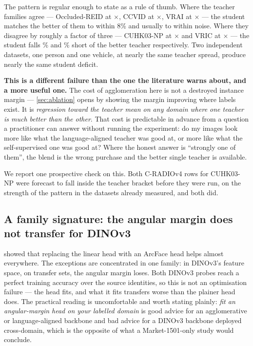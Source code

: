 \begin{table}[t]
\centering
\caption{Best-of-family ArcFace mAP, with the teachers' spread and the student's position
inside it. \emph{spread} is the ratio of the better teacher family to the worse; \emph{vs.\
best} is the student's relative distance from the better one. The two datasets where the
teachers disagree by roughly 3$\times$ both cost the student roughly
45\%.}
\label{tab:bracket}
\scriptsize
\setlength{\tabcolsep}{3pt}

\end{table}

The pattern is regular enough to state as a rule of thumb. Where the teacher families agree
--- Occluded-REID at \spreadOccluded{}$\times$, CCVID at \spreadCcvid{}$\times$, VRAI at
\spreadVrai{}$\times$ --- the student matches the better of them to within
8\% and usually to within noise. Where they disagree by roughly a factor of three
--- CUHK03-NP at \spreadCuhk{}$\times$ and VRIC at \spreadVric{}$\times$ --- the student falls
\deficitCuhk{}\% and \deficitVric{}\% short of the better teacher respectively. Two independent
datasets, one person and one vehicle, at nearly the same teacher spread, produce nearly the
same student deficit.

\textbf{This is a different failure than the one the literature warns about, and a more useful
one.} The cost of agglomeration here is not a destroyed instance margin --- \cref{sec:ablation}
opens by showing the margin improving where labels exist. It is \emph{regression toward the
teacher mean on any domain where one teacher is much better than the other}. That cost is
predictable in advance from a question a practitioner can answer without running the
experiment: do my images look more like what the language-aligned teacher was good at, or more
like what the self-supervised one was good at? Where the honest answer is ``strongly one of
them'', the blend is the wrong purchase and the better single teacher is available.

We report one prospective check on this. Both C-RADIOv4 rows for CUHK03-NP were forecast to
fall inside the teacher bracket before they were run, on the strength of the pattern in the
datasets already measured, and both did.

\subsection{A family signature: the angular margin does not transfer for DINOv3}
\Cref{tab:margin} showed that replacing the linear head with an ArcFace head helps almost
everywhere. The exceptions are concentrated in one family: in DINOv3's feature space, on
transfer sets, the angular margin loses. Both DINOv3 probes reach a perfect training accuracy
over the source identities, so this is not an optimisation failure --- the head fits, and what
it fits transfers worse than the plainer head does. The practical reading is uncomfortable and
worth stating plainly: \emph{fit an angular-margin head on your labelled domain} is good advice
for an agglomerative or language-aligned backbone and bad advice for a DINOv3 backbone deployed
cross-domain, which is the opposite of what a Market-1501-only study would conclude.

